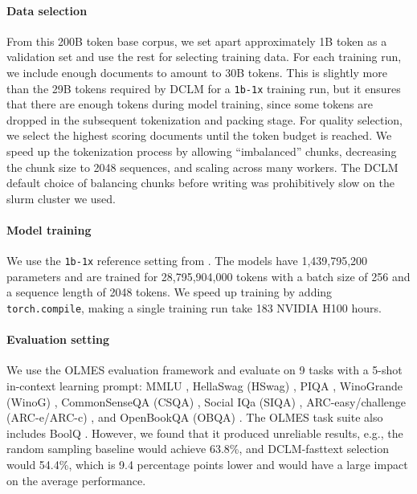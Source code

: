 \paragraph{Data selection}
From this 200B token base corpus, we set apart approximately 1B token as a validation set and use the rest for selecting training data.
For each training run, we include enough documents to amount to 30B tokens.
This is slightly more than the 29B tokens required by DCLM for a \texttt{1b-1x} training run,
but it ensures that there are enough tokens during model training, since some tokens are dropped in the subsequent tokenization and packing stage.
For quality selection, we select the highest scoring documents until the token budget is reached.
We speed up the tokenization process by allowing ``imbalanced'' chunks, decreasing the chunk size to 2048 sequences, and scaling across many workers. The DCLM default choice of balancing chunks before writing was prohibitively slow on the slurm cluster we used.

\paragraph{Model training}
We use the {\tt 1b-1x} reference setting from \citet{li2024datacomplm}. The models have 1,439,795,200 parameters and are trained for 28,795,904,000 tokens with a batch size of 256 and a sequence length of 2048 tokens. We speed up training by adding {\tt torch.compile}, making a single training run take 183 NVIDIA H100 hours.

\paragraph{Evaluation setting}
We use the OLMES evaluation framework \citep{gu2024olmes} and evaluate on 9 tasks with a 5-shot in-context learning prompt: MMLU \citep{hendrycks2021measuring}, HellaSwag (HSwag) \citep{zellers2019hellaswag}, PIQA \citep{bisk2020piqa}, WinoGrande (WinoG) \citep{sakaguchi2021winogrande}, CommonSenseQA (CSQA) \citep{talmor2019commonsenseqa}, Social IQa (SIQA) \citep{sap2019social}, ARC-easy/challenge (ARC-e/ARC-c) \citep{clark2018think}, and OpenBookQA (OBQA) \citep{mihaylov2018suit}.
The OLMES task suite also includes BoolQ \citep{clark2019boolq}. However, we found that it produced unreliable results, e.g., the random sampling baseline would achieve 63.8\%, and DCLM-fasttext selection would 54.4\%, which is 9.4 percentage points lower and would have a large impact on the average performance.

